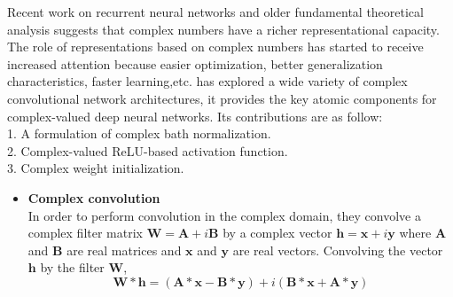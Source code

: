 \documentclass[11pt]{report}
\begin{document}
    \noindent Recent work on recurrent neural networks and older fundamental theoretical analysis suggests that complex numbers have a richer representational capacity. The role of representations based on complex numbers has started to receive increased attention because easier optimization, better generalization characteristics, faster learning,etc.  \cite{DBLP:journals/corr/TrabelsiBSSSMRB17} has explored a wide variety of complex convolutional network architectures, it provides the key atomic components for complex-valued deep neural networks. Its contributions are as follow:\\
    1. A formulation of complex bath normalization.\\
    2. Complex-valued ReLU-based activation function.\\
    3. Complex weight initialization.
    \begin{itemize}
    	\item \textbf{Complex convolution}\\
    	In order to perform convolution in the complex domain, they convolve a complex filter matrix $\mathbf{W} = \mathbf{A}+i\mathbf{B}$ by a complex vector $\mathbf{h} = \mathbf{x}+i\mathbf{y}$ where $\mathbf{A}$ and $\mathbf{B}$ are real matrices and $\mathbf{x}$ and $\mathbf{y}$ are real vectors. Convolving the vector $\mathbf{h}$ by the filter $\mathbf{W}$,
    	\begin{equation}
    	\mathbf{W} * \mathbf{h} = \left(\mathbf{A} * \mathbf{x}-\mathbf{B} * \mathbf{y}\right) + i\left(\mathbf{B} * \mathbf{x} + \mathbf{A} * \mathbf{y}\right)
    	\end{equation}
    \end{itemize}
    
\end{document}
